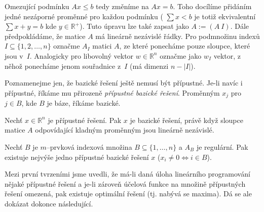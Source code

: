 Omezující podmínku $Ax\leq b$ tedy změníme na $Ax=b$. Toho docílíme přidáním jedné nezáporné proměnné pro každou podmínku ( $\sum{x}<b$ je totiž ekvivalentní $\sum{x}+y=b$ kde $y\in\mathbb{R}^+$). Tuto úpravu lze také zapsat jako $A:=(A\ I)$. Dále předpokládáme, že matice $A$ má lineárně nezávislé řádky.
Pro podmnožinu indexů $I\subseteq \{1, 2, \dots, n\}$
označme $A_I$ matici $A$, ze které ponecháme pouze sloupce, které jsou v~$I$. Analogicky pro libovolný vektor $w\in\mathbb{R}^n$
označme jako $w_I$ vektor, z něhož ponecháme jenom souřadnice z~$I$ (má dimenzi $n-|I|$).

Poznamenejme jen, že bazické řešení ještě nemusí být přípustné. Je-li navíc i přípustné,
říkáme mu přirozeně {\it přípustné bazické řešení}. Proměnným $x_j$ pro $j\in B$, kde
$B$ je báze, říkáme bazické.

\begin{veta}
Nechť $x\in\mathbb{R}^n$ je přípustné řešení. Pak $x$ je bazické řešení, právě když
sloupce matice $A$ odpovídající kladným proměnným jsou lineárně nezávislé.
\end{veta}

\begin{veta}
Nechť $B$ je $m$--prvková indexová množina $B\subseteq \{1,\dots, n\}$ a $A_B$ je regulární. Pak existuje
nejvýše jedno přípustné bazické řešení $x$ ($x_i\neq 0 \Leftrightarrow i\in B$).
\end{veta}

Mezi první tvrzeními jsme uvedli, že má-li daná úloha lineárního programování nějaké přípustné
řešení a je-li zároveň účelová funkce na množině přípustných řešení omezená, pak existuje
optimální řešení (tj. nabývá se maxima). Dá se ale dokázat dokonce následující.

